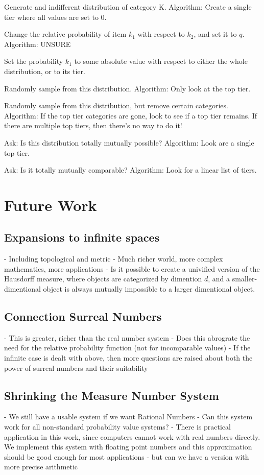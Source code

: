 \documentclass[twoside]{article}
\begin{document}
Generate and indifferent distribution of category K. Algorithm: Create a single tier where all values are set to 0.

Change the relative probability of item \(k_1\) with respect to \(k_2\), and set it to \(q\). Algorithm: UNSURE

Set the probability \(k_1\) to some absolute value with respect to either the whole distribution, or to its tier.

Randomly sample from this distribution. Algorithm: Only look at the top tier.

Randomly sample from this distribution, but remove certain categories. Algorithm: If the top tier categories are gone, look to see if a top tier remains. If there are multiple top tiers, then there's no way to do it!

Ask: Is this distribution totally mutually possible? Algorithm: Look are a single top tier.

Ask: Is it totally mutually comparable? Algorithm: Look for a linear list of tiers.

\section{Future Work}
\subsection{Expansions to infinite spaces}
- Including topological and metric
- Much richer world, more complex mathematics, more applications
- Is it possible to create a univified version of the Hausdorff measure, where objects are categorized by dimention \(d\), and a smaller-dimentional object is always mutually impossible to a larger dimentional object.
\subsection{Connection Surreal Numbers}
- This is greater, richer than the real number system
- Does this abrograte the need for the relative probability function (not for incomparable values)
- If the infinite case is dealt with above, then more questions are raised about both the power of surreal numbers and their suitability
\subsection{Shrinking the Measure Number System}
- We still have a usable system if we want Rational Numbers
- Can this system work for all non-standard probability value systems?
- There is practical application in this work, since computers cannot work with real numbers directly. We implement this system with floating point numbers and this approximation should be good enough for most applications - but can we have a version with more precise arithmetic
\end{document}
